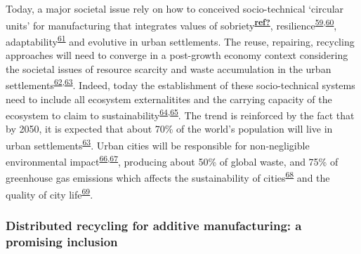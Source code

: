 \documentclass[
  11pt,
  a4paperpaper,
  onecolumn]{article}
\begin{document}
Today, a major societal issue rely on how to conceived socio-technical
`circular units' for manufacturing that integrates values of
sobriety\textsuperscript{\protect\hyperlink{ref-ref}{\textbf{ref?}}},
resilience\textsuperscript{\protect\hyperlink{ref-touriki2021}{59},\protect\hyperlink{ref-VanFan2019}{60}},
adaptability\textsuperscript{\protect\hyperlink{ref-weichhart2021}{61}}
and evolutive in urban settlements. The reuse, repairing, recycling
approaches will need to converge in a post-growth economy context
considering the societal issues of resource scarcity and waste
accumulation in the urban
settlements\textsuperscript{\protect\hyperlink{ref-kallis2018}{62},\protect\hyperlink{ref-savini2021}{63}}.
Indeed, today the establishment of these socio-technical systems need to
include all ecosystem externalitites and the carrying capacity of the
ecosystem to claim to
sustainability\textsuperscript{\protect\hyperlink{ref-Bakshi2018}{64},\protect\hyperlink{ref-Bakshi2019a}{65}}.
The trend is reinforced by the fact that by 2050, it is expected that
about 70\% of the world's population will live in urban
settlements\textsuperscript{\protect\hyperlink{ref-savini2021}{63}}.
Urban cities will be responsible for non-negligible environmental
impact\textsuperscript{\protect\hyperlink{ref-Zheng2020}{66},\protect\hyperlink{ref-Sodiq2019}{67}},
producing about 50\% of global waste, and 75\% of greenhouse gas
emissions which affects the sustainability of
cities\textsuperscript{\protect\hyperlink{ref-schraven2021}{68}} and the
quality of city
life\textsuperscript{\protect\hyperlink{ref-Riffat2016}{69}}.

\hypertarget{distributed-recycling-for-additive-manufacturing-a-promising-inclusion}{%
\subsubsection{Distributed recycling for additive manufacturing: a
promising
inclusion}\label{distributed-recycling-for-additive-manufacturing-a-promising-inclusion}}
\end{document}
